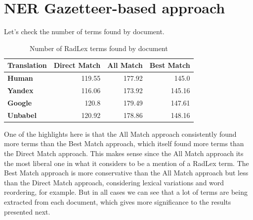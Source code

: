 \label{chap4}





\section{NER Gazetteer-based approach}

Let's check the number of terms found by document.

\begin{table}[ht]
    \centering
    \begin{tabular}{lrrr}
    \toprule
    \textbf{Translation}   &   \textbf{Direct Match} &   \textbf{All Match} &   \textbf{Best Match} \\
    \midrule
     \textbf{Human}         &         119.55 &      177.92 &       145.0 \\

     \textbf{Yandex}        &         116.06 &      173.92 &       145.16 \\

     \textbf{Google}        &         120.8 &      179.49 &       147.61 \\

     \textbf{Unbabel}       &         120.92 &      178.86 &       148.16 \\

    \bottomrule
    \end{tabular} 
    \caption{Number of RadLex terms found by document}
    \label{table:terms_by_document}
\end{table}

One of the highlights here is that the All Match approach consistently found more terms than the Best Match approach, which itself found more terms than the Direct Match approach. This makes sense since the All Match approach its the most liberal one in what it considers to be a mention of a RadLex term. The Best Match approach is more conservative than the All Match approach but less than the Direct Match approach, considering lexical variations and word reordering, for example. But in all cases we can see that a lot of terms are being extracted from each document, which gives more significance to the results presented next. 


